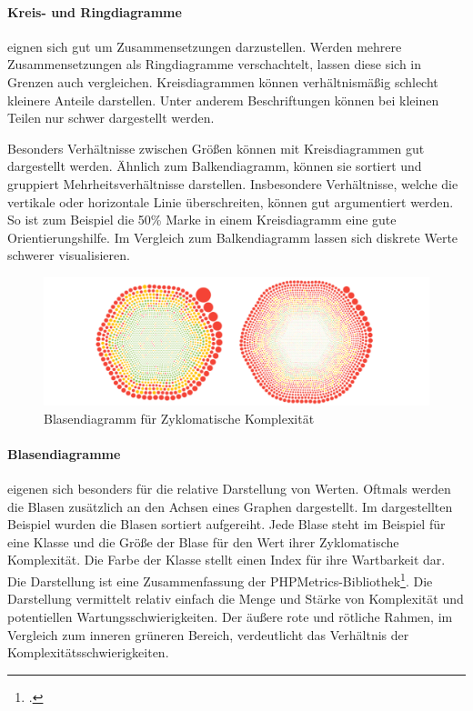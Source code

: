\paragraph{Kreis- und Ringdiagramme} eignen sich gut um Zusammensetzungen darzustellen. Werden mehrere Zusammensetzungen als Ringdiagramme verschachtelt, lassen diese sich in Grenzen auch vergleichen. Kreisdiagrammen können verhältnismäßig schlecht kleinere Anteile darstellen. Unter anderem Beschriftungen können bei kleinen Teilen nur schwer dargestellt werden.

Besonders Verhältnisse zwischen Größen können mit Kreisdiagrammen gut dargestellt werden. Ähnlich zum Balkendiagramm, können sie sortiert und gruppiert Mehrheitsverhältnisse darstellen. Insbesondere Verhältnisse, welche die vertikale oder horizontale Linie überschreiten, können gut argumentiert werden. So ist zum Beispiel die 50\% Marke in einem Kreisdiagramm eine gute Orientierungshilfe. Im Vergleich zum Balkendiagramm lassen sich diskrete Werte schwerer visualisieren.

\begin{figure}[htbp]
  \includegraphics[width=\textwidth, height=\textheight, keepaspectratio]
    {resources/bubble-complexity-chart.pdf}
  \caption{Blasendiagramm für Zyklomatische Komplexität}
  \label{bubble-complexity}
\end{figure}
\paragraph{Blasendiagramme} eigenen sich besonders für die relative Darstellung von Werten. Oftmals werden die Blasen zusätzlich an den Achsen eines Graphen dargestellt. Im dargestellten Beispiel wurden die Blasen sortiert aufgereiht. Jede Blase steht im Beispiel für eine Klasse und die Größe der Blase für den Wert ihrer Zyklomatische Komplexität. Die Farbe der Klasse stellt einen Index für ihre Wartbarkeit dar. Die Darstellung ist eine Zusammenfassung der PHPMetrics\hyp{}Bibliothek\footcite{php-metrics-docu}. 
Die Darstellung vermittelt relativ einfach die Menge und Stärke von Komplexität und potentiellen Wartungsschwierigkeiten. Der äußere rote und rötliche Rahmen, im Vergleich zum inneren grüneren Bereich, verdeutlicht das Verhältnis der Komplexitätsschwierigkeiten.

